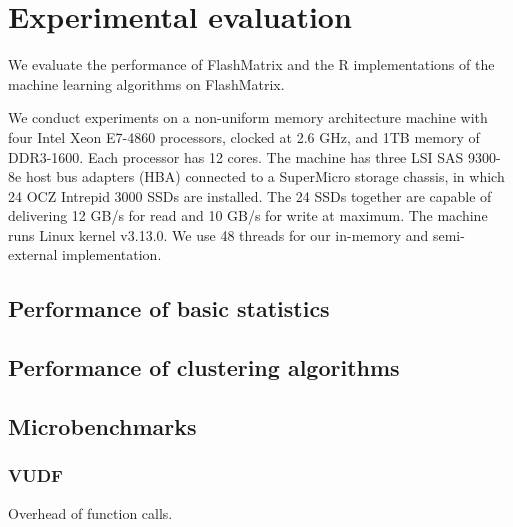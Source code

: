 \section{Experimental evaluation}
We evaluate the performance of FlashMatrix and the R implementations of
the machine learning algorithms on FlashMatrix.

We conduct experiments on a non-uniform memory architecture machine with
four Intel Xeon E7-4860 processors, clocked at 2.6 GHz, and 1TB memory of
DDR3-1600. Each processor has 12 cores. The machine has three LSI SAS 9300-8e
host bus adapters (HBA) connected to a SuperMicro storage chassis, in which
24 OCZ Intrepid 3000 SSDs are installed. The 24 SSDs together are capable of
delivering 12 GB/s for read and 10 GB/s for write at maximum. The machine runs
Linux kernel v3.13.0. We use 48 threads for our in-memory and semi-external
implementation.

\subsection{Performance of basic statistics}

\subsection{Performance of clustering algorithms}

\subsection{Microbenchmarks}

\subsubsection{VUDF}
Overhead of function calls.

